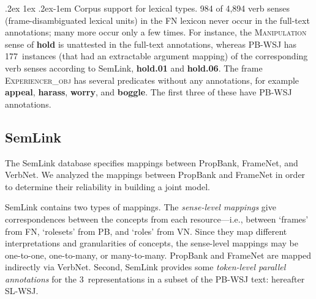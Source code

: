 \documentclass[11pt]{article}
\makeatletter
\newcommand{\ensuretext}[1]{#1}
\newcommand{\nssmarker}{\ensuretext{\textcolor{magenta}{\ensuremath{^{\textsc{NS}}_{\textsc{S}}}}}}
\newcommand{\arkcomment}[3]{\ensuretext{\textcolor{#3}{[#1 #2]}}}
\newcommand{\nss}[1]{\arkcomment{\nssmarker}{#1}{magenta}}
\renewcommand{\paragraph}{%
  \@startsection{paragraph}{4}%
  {\z@}{.2ex \@plus 1ex \@minus .2ex}{-1em}%
  {\normalfont\normalsize\bfseries}%
}
\newcommand{\finalversion}[1]{}
\newcommand{\vpred}[1]{\textbf{#1}} %
\newcommand{\fname}[1]{\textsc{#1}} %
\makeatother
\begin{document}
\paragraph{Corpus support for lexical types.} 984 of 4,894 verb senses (frame-disambiguated lexical units) in the FN lexicon 
never occur in the full-text annotations; many more occur only a few times.\finalversion{\nss{how many verb *types* occur at least once in PB?}}
For instance, the \fname{Manipulation} sense of \vpred{hold} is unattested in the full-text annotations,
whereas PB-WSJ has 177~instances (that had an extractable argument mapping) of the corresponding 
verb senses according to SemLink, \vpred{hold.01} and \vpred{hold.06}.
The frame \fname{Experiencer\_obj} has several predicates without any annotations, 
for example \vpred{appeal}, \vpred{harass}, \vpred{worry}, and \vpred{boggle}. 
The first three of these have PB-WSJ annotations. 

\subsection{SemLink}\label{sec:semlink}
The SemLink database \citep{semlink} specifies mappings between PropBank, FrameNet, and VerbNet. 
We analyzed the mappings between PropBank and FrameNet in order to determine their reliability in building a joint model.

SemLink contains two types of mappings. The \emph{sense-level mappings} give correspondences between the concepts
from each resource---i.e., between `frames' from FN, `rolesets' from PB, and `roles' from VN. 
Since they map different interpretations and granularities 
of concepts, the sense-level mappings may be one-to-one, one-to-many, or many-to-many.
PropBank and FrameNet are mapped indirectly via VerbNet. %
Second, SemLink provides some \emph{token-level parallel annotations} 
for the 3~representations in a subset of the PB-WSJ text: hereafter SL-WSJ.
\end{document}
